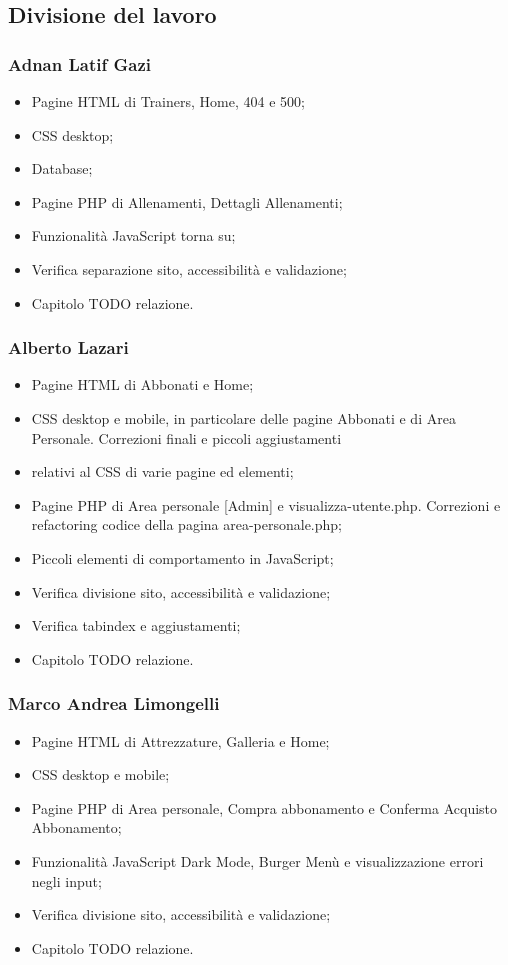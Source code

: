 \documentclass[a4paper]{article}
\begin{document}
	\subsection{Divisione del lavoro}

	\subsubsection{Adnan Latif Gazi}
	\begin{itemize}
		\item Pagine HTML di Trainers, Home, 404 e 500;
		\item CSS desktop;
		\item Database;
		\item Pagine PHP di Allenamenti, Dettagli Allenamenti;
		\item Funzionalità JavaScript torna su;
		\item Verifica separazione sito, accessibilità e validazione;
		\item Capitolo TODO relazione.        
	\end{itemize}

	\subsubsection{Alberto Lazari}
	\begin{itemize}
		\item Pagine HTML di Abbonati e Home;
		\item CSS desktop e mobile, in particolare delle pagine Abbonati e di Area Personale. Correzioni finali e piccoli aggiustamenti \item relativi al CSS di varie pagine ed elementi;
		\item Pagine PHP di Area personale [Admin] e visualizza-utente.php. Correzioni e refactoring codice della pagina area-personale.php;
		\item Piccoli elementi di comportamento in JavaScript;
		\item Verifica divisione sito, accessibilità e validazione;
		\item Verifica tabindex e aggiustamenti;
		\item Capitolo TODO relazione.        
	\end{itemize}

	\subsubsection{Marco Andrea Limongelli}
	\begin{itemize}
		\item Pagine HTML di Attrezzature, Galleria e Home;
		\item CSS desktop e mobile;
		\item Pagine PHP di Area personale, Compra abbonamento e Conferma Acquisto Abbonamento;
		\item Funzionalità JavaScript Dark Mode, Burger Menù e visualizzazione errori negli input;
		\item Verifica divisione sito, accessibilità e validazione;
		\item Capitolo TODO relazione.        
	\end{itemize}
\end{document}

